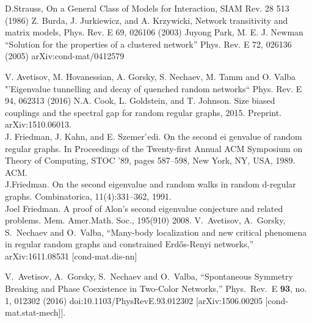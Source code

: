 \documentclass[aps,12pt]{revtex4}
\begin{document}
\begin{thebibliography}{99}

D.Strauss, On a General Class of Models for Interaction, SIAM Rev. 28 513 (1986)
Z. Burda, J. Jurkiewicz, and A. Krzywicki, Network transitivity and matrix models,
Phys. Rev. E 69, 026106 (2003)
Juyong Park, M. E. J. Newman
"`Solution for the properties of a clustered network"'
Phys. Rev. E 72, 026136 (2005)
arXiv:cond-mat/0412579

V. Avetisov, M. Hovanessian, A. Gorsky, S. Nechaev, M. Tamm and O. Valba
"'Eigenvalue tunnelling and decay of quenched random networks``
Phys. Rev. E 94, 062313 (2016)
N.A. Cook, L. Goldstein, and T. Johnson. Size biased couplings and the spectral gap for
random regular graphs, 2015. Preprint. arXiv:1510.06013.\\
J. Friedman, J. Kahn, and E. Szemer ́edi. On the second ei
genvalue of random regular graphs.
In Proceedings of the Twenty-first Annual ACM Symposium on Theory of Computing, STOC
’89, pages 587–598, New York, NY, USA, 1989. ACM.\\
J.Friedman. On the second eigenvalue and random walks in random d-regular graphs.
Combinatorica, 11(4):331–362, 1991.\\
Joel Friedman. A proof of Alon’s second eigenvalue conjecture and related problems.
Mem. Amer.Math. Soc., 195(910) 2008.
 V.~Avetisov, A.~Gorsky, S.~Nechaev and O.~Valba,
  ``Many-body localization and new critical phenomena in regular random graphs and constrained Erd\H{o}s-Renyi networks,''
  arXiv:1611.08531 [cond-mat.dis-nn]

 V.~Avetisov, A.~Gorsky, S.~Nechaev and O.~Valba,
  ``Spontaneous Symmetry Breaking and Phase Coexistence in Two-Color Networks,''
  Phys.\ Rev.\ E {\bf 93}, no. 1, 012302 (2016)
  doi:10.1103/PhysRevE.93.012302
  [arXiv:1506.00205 [cond-mat.stat-mech]].



\end{thebibliography}
\end{document}
